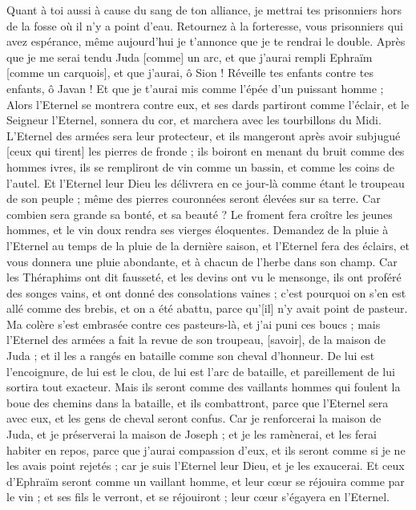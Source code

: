 \begin{multicols}{2}
Quant à toi aussi à cause du sang de ton alliance, je mettrai tes prisonniers hors de la fosse où il n'y a point d'eau.
Retournez à la forteresse, vous prisonniers qui avez espérance, même aujourd'hui je t'annonce que je te rendrai le double.
Après que je me serai tendu Juda [comme] un arc, et que j'aurai rempli Ephraïm [comme un carquois], et que j'aurai, ô Sion ! Réveille tes enfants contre tes enfants, ô Javan ! Et que je t'aurai mis comme l'épée d'un puissant homme ;
Alors l'Eternel se montrera contre eux, et ses dards partiront comme l'éclair, et le Seigneur l'Eternel, sonnera du cor, et marchera avec les tourbillons du Midi.
L'Eternel des armées sera leur protecteur, et ils mangeront après avoir subjugué [ceux qui tirent] les pierres de fronde ; ils boiront en menant du bruit comme des hommes ivres, ils se rempliront de vin comme un bassin, et comme les coins de l'autel.
Et l'Eternel leur Dieu les délivrera en ce jour-là comme étant le troupeau de son peuple ; même des pierres couronnées seront élevées sur sa terre.
Car combien sera grande sa bonté, et sa beauté ? Le froment fera croître les jeunes hommes, et le vin doux rendra ses vierges éloquentes.
\VerseOne{}Demandez de la pluie à l'Eternel au temps de la pluie de la dernière saison, et l'Eternel fera des éclairs, et vous donnera une pluie abondante, et à chacun de l'herbe dans son champ.
Car les Théraphims ont dit fausseté, et les devins ont vu le mensonge, ils ont proféré des songes vains, et ont donné des consolations vaines ; c'est pourquoi on s'en est allé comme des brebis, et on a été abattu, parce qu'[il] n'y avait point de pasteur.
Ma colère s'est embrasée contre ces pasteurs-là, et j'ai puni ces boucs ; mais l'Eternel des armées a fait la revue de son troupeau, [savoir], de la maison de Juda ; et il les a rangés en bataille comme son cheval d'honneur.
De lui est l'encoignure, de lui est le clou, de lui est l'arc de bataille, et pareillement de lui sortira tout exacteur.
Mais ils seront comme des vaillants hommes qui foulent la boue des chemins dans la bataille, et ils combattront, parce que l'Eternel sera avec eux, et les gens de cheval seront confus.
Car je renforcerai la maison de Juda, et je préserverai la maison de Joseph ; et je les ramènerai, et les ferai habiter en repos, parce que j'aurai compassion d'eux, et ils seront comme si je ne les avais point rejetés ; car je suis l'Eternel leur Dieu, et je les exaucerai.
Et ceux d'Ephraïm seront comme un vaillant homme, et leur cœur se réjouira comme par le vin ; et ses fils le verront, et se réjouiront ; leur cœur s'égayera en l'Eternel.

\end{multicols}
